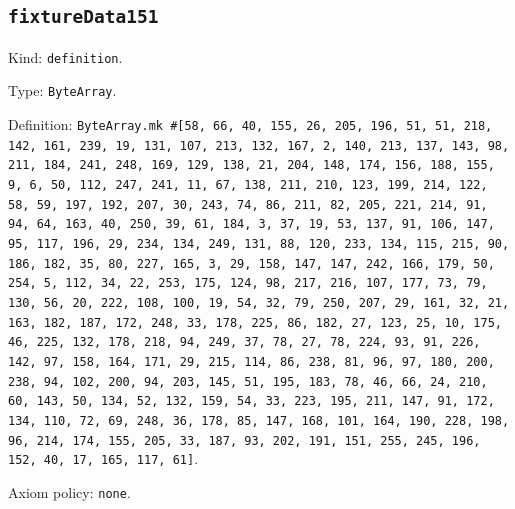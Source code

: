 \documentclass[11pt]{article}
\begin{document}
\subsection*{\texttt{fixtureData151}}
\noindent Kind: \texttt{definition}.\par
\noindent Type: \texttt{ByteArray}.\par
\noindent Definition: \texttt{ByteArray.mk \#[58, 66, 40, 155, 26, 205, 196, 51, 51, 218, 142, 161, 239, 19, 131, 107, 213, 132, 167, 2, 140, 213, 137, 143, 98, 211, 184, 241, 248, 169, 129, 138, 21, 204, 148, 174, 156, 188, 155, 9, 6, 50, 112, 247, 241, 11, 67, 138, 211, 210, 123, 199, 214, 122, 58, 59, 197, 192, 207, 30, 243, 74, 86, 211, 82, 205, 221, 214, 91, 94, 64, 163, 40, 250, 39, 61, 184, 3, 37, 19, 53, 137, 91, 106, 147, 95, 117, 196, 29, 234, 134, 249, 131, 88, 120, 233, 134, 115, 215, 90, 186, 182, 35, 80, 227, 165, 3, 29, 158, 147, 147, 242, 166, 179, 50, 254, 5, 112, 34, 22, 253, 175, 124, 98, 217, 216, 107, 177, 73, 79, 130, 56, 20, 222, 108, 100, 19, 54, 32, 79, 250, 207, 29, 161, 32, 21, 163, 182, 187, 172, 248, 33, 178, 225, 86, 182, 27, 123, 25, 10, 175, 46, 225, 132, 178, 218, 94, 249, 37, 78, 27, 78, 224, 93, 91, 226, 142, 97, 158, 164, 171, 29, 215, 114, 86, 238, 81, 96, 97, 180, 200, 238, 94, 102, 200, 94, 203, 145, 51, 195, 183, 78, 46, 66, 24, 210, 60, 143, 50, 134, 52, 132, 159, 54, 33, 223, 195, 211, 147, 91, 172, 134, 110, 72, 69, 248, 36, 178, 85, 147, 168, 101, 164, 190, 228, 198, 96, 214, 174, 155, 205, 33, 187, 93, 202, 191, 151, 255, 245, 196, 152, 40, 17, 165, 117, 61]}.\par
\noindent Axiom policy: \texttt{none}.\par
\end{document}
